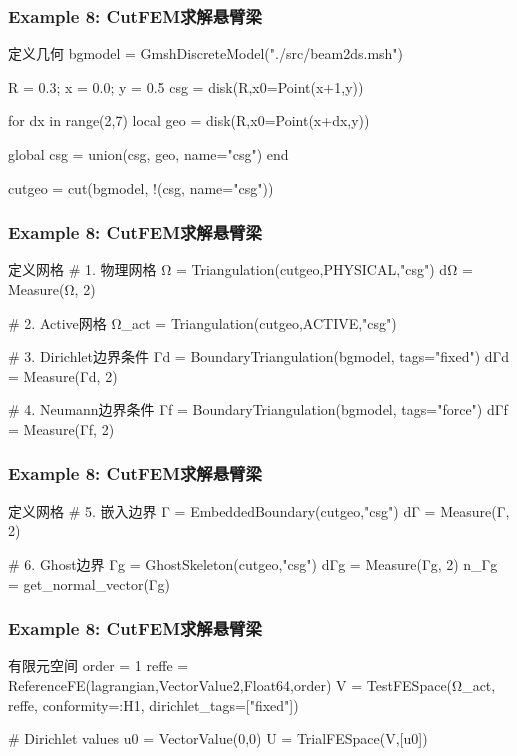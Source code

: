 \documentclass[lang=en,aspectratio=43,theme=default,logo=on]{simplebeamer}
\begin{document}
\begin{frame}[fragile]
    \frametitle{Example 8: CutFEM求解悬臂梁}
    \begin{codex}{1}{定义几何}
bgmodel = GmshDiscreteModel("./src/beam2ds.msh")

R = 0.3; x = 0.0; y = 0.5
csg = disk(R,x0=Point(x+1,y))

for dx in range(2,7)
    local geo = disk(R,x0=Point(x+dx,y))

    global csg = union(csg, geo, name="csg")
end

cutgeo = cut(bgmodel, !(csg, name="csg"))
    \end{codex}
\end{frame}

\begin{frame}[fragile]
    \frametitle{Example 8: CutFEM求解悬臂梁}
\begin{codex}{1}{定义网格}
# 1. 物理网格
Ω = Triangulation(cutgeo,PHYSICAL,"csg")
dΩ = Measure(Ω, 2)

# 2. Active网格
Ω_act = Triangulation(cutgeo,ACTIVE,"csg")

# 3. Dirichlet边界条件
Γd = BoundaryTriangulation(bgmodel, tags="fixed")
dΓd = Measure(Γd, 2)

# 4. Neumann边界条件
Γf = BoundaryTriangulation(bgmodel, tags="force")
dΓf = Measure(Γf, 2)
\end{codex}
\end{frame}

\begin{frame}[fragile]
    \frametitle{Example 8: CutFEM求解悬臂梁}
\begin{codex}{15}{定义网格}
# 5. 嵌入边界
Γ = EmbeddedBoundary(cutgeo,"csg")
dΓ = Measure(Γ, 2)

# 6. Ghost边界
Γg = GhostSkeleton(cutgeo,"csg")
dΓg = Measure(Γg, 2)
n_Γg = get_normal_vector(Γg)
\end{codex}
\end{frame}

\begin{frame}[fragile]
    \frametitle{Example 8: CutFEM求解悬臂梁}
\begin{codex}{15}{有限元空间}
order = 1
reffe = ReferenceFE(lagrangian,VectorValue{2,Float64},order)
V = TestFESpace(Ω_act, reffe, conformity=:H1, dirichlet_tags=["fixed"])

# Dirichlet values
u0 = VectorValue(0,0)
U = TrialFESpace(V,[u0])
\end{codex}
\end{frame}
\end{document}
